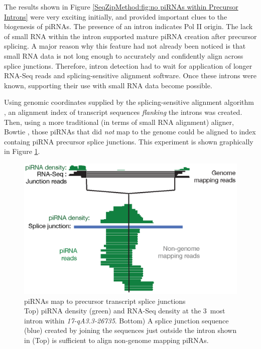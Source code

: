   The results shown in Figure \ref{SeqZipMethod:fig:no piRNAs within Precursor Introns} were very exciting initially, and provided important clues to the biogenesis of piRNAs. The presence of an intron indicates Pol II origin. The lack of small RNA within the intron supported mature piRNA creation after precursor splicing. A major reason why this feature had not already been noticed is that small RNA data is not long enough to accurately and confidently align across splice junctions. Therefore, intron detection had to wait for application of longer RNA-Seq reads and splicing-sensitive alignment software. Once these introns were known, supporting their use with small RNA data become possible.

  Using genomic coordinates supplied by the splicing-sensitive alignment algorithm \citep{Trapnell2009}, an alignment index of transcript sequences \textit{flanking} the introns was created. Then, using a more traditional (in terms of small RNA alignment) aligner, Bowtie \citep{Langmead2009}, those piRNAs that did \textit{not} map to the genome could be aligned to index containg piRNA precursor splice junctions. This experiment is shown graphically in Figure \ref{SeqZipMethod:fig: piRNAs map to SJ}.

  \begin{figure} %
    \centering 
    \includegraphics{Figures/SeqZipMethod/smallRNAsMapToPrecursorSJ.eps}
    \caption[piRNAs map to precursor transcript splice junctions]
    {
      piRNAs map to precursor transcript splice junctions\\[0.25cm]
      Top) piRNA density (green) and RNA-Seq density at the 3\textprime~most intron within \textit{17-qA3.3-26735}. Bottom) A splice junction sequence (blue) created by joining the sequences just outside the intron shown in (Top) is sufficient to align non-genome mapping piRNAs.
      }
    \label{SeqZipMethod:fig: piRNAs map to SJ}
    \end{figure}


